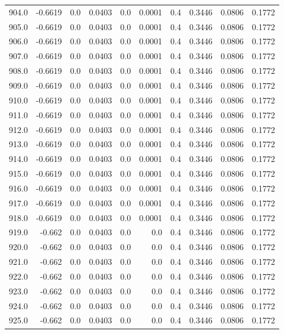 \begin{longtable}{lrrrrrrrrr}
904.0 & -0.6619 & 0.0 & 0.0403 & 0.0 & 0.0001 & 0.4 & 0.3446 & 0.0806 & 0.1772 \\
905.0 & -0.6619 & 0.0 & 0.0403 & 0.0 & 0.0001 & 0.4 & 0.3446 & 0.0806 & 0.1772 \\
906.0 & -0.6619 & 0.0 & 0.0403 & 0.0 & 0.0001 & 0.4 & 0.3446 & 0.0806 & 0.1772 \\
907.0 & -0.6619 & 0.0 & 0.0403 & 0.0 & 0.0001 & 0.4 & 0.3446 & 0.0806 & 0.1772 \\
908.0 & -0.6619 & 0.0 & 0.0403 & 0.0 & 0.0001 & 0.4 & 0.3446 & 0.0806 & 0.1772 \\
909.0 & -0.6619 & 0.0 & 0.0403 & 0.0 & 0.0001 & 0.4 & 0.3446 & 0.0806 & 0.1772 \\
910.0 & -0.6619 & 0.0 & 0.0403 & 0.0 & 0.0001 & 0.4 & 0.3446 & 0.0806 & 0.1772 \\
911.0 & -0.6619 & 0.0 & 0.0403 & 0.0 & 0.0001 & 0.4 & 0.3446 & 0.0806 & 0.1772 \\
912.0 & -0.6619 & 0.0 & 0.0403 & 0.0 & 0.0001 & 0.4 & 0.3446 & 0.0806 & 0.1772 \\
913.0 & -0.6619 & 0.0 & 0.0403 & 0.0 & 0.0001 & 0.4 & 0.3446 & 0.0806 & 0.1772 \\
914.0 & -0.6619 & 0.0 & 0.0403 & 0.0 & 0.0001 & 0.4 & 0.3446 & 0.0806 & 0.1772 \\
915.0 & -0.6619 & 0.0 & 0.0403 & 0.0 & 0.0001 & 0.4 & 0.3446 & 0.0806 & 0.1772 \\
916.0 & -0.6619 & 0.0 & 0.0403 & 0.0 & 0.0001 & 0.4 & 0.3446 & 0.0806 & 0.1772 \\
917.0 & -0.6619 & 0.0 & 0.0403 & 0.0 & 0.0001 & 0.4 & 0.3446 & 0.0806 & 0.1772 \\
918.0 & -0.6619 & 0.0 & 0.0403 & 0.0 & 0.0001 & 0.4 & 0.3446 & 0.0806 & 0.1772 \\
919.0 & -0.662 & 0.0 & 0.0403 & 0.0 & 0.0 & 0.4 & 0.3446 & 0.0806 & 0.1772 \\
920.0 & -0.662 & 0.0 & 0.0403 & 0.0 & 0.0 & 0.4 & 0.3446 & 0.0806 & 0.1772 \\
921.0 & -0.662 & 0.0 & 0.0403 & 0.0 & 0.0 & 0.4 & 0.3446 & 0.0806 & 0.1772 \\
922.0 & -0.662 & 0.0 & 0.0403 & 0.0 & 0.0 & 0.4 & 0.3446 & 0.0806 & 0.1772 \\
923.0 & -0.662 & 0.0 & 0.0403 & 0.0 & 0.0 & 0.4 & 0.3446 & 0.0806 & 0.1772 \\
924.0 & -0.662 & 0.0 & 0.0403 & 0.0 & 0.0 & 0.4 & 0.3446 & 0.0806 & 0.1772 \\
925.0 & -0.662 & 0.0 & 0.0403 & 0.0 & 0.0 & 0.4 & 0.3446 & 0.0806 & 0.1772 \\

\end{longtable}
